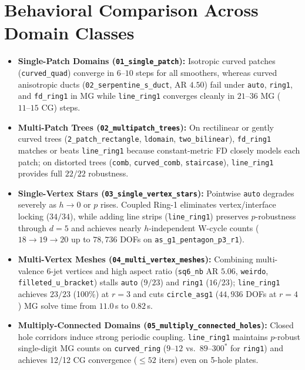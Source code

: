 \documentclass[10pt,a4paper]{article}
\begin{document}
\section{Behavioral Comparison Across Domain Classes}
\begin{itemize}
  \item \textbf{Single-Patch Domains (\texttt{01\_single\_patch}):} Isotropic curved patches (\texttt{curved\_quad}) converge in $6\text{--}10$ steps for all smoothers, whereas curved anisotropic ducts (\texttt{02\_serpentine\_s\_duct}, AR $4.50$) fail under \texttt{auto}, \texttt{ring1}, and \texttt{fd\_ring1} in MG while \texttt{line\_ring1} converges cleanly in $21\text{--}36$ MG ($11\text{--}15$ CG) steps.
  \item \textbf{Multi-Patch Trees (\texttt{02\_multipatch\_trees}):} On rectilinear or gently curved trees (\texttt{2\_patch\_rectangle}, \texttt{ldomain}, \texttt{two\_bilinear}), \texttt{fd\_ring1} matches or beats \texttt{line\_ring1} because constant-metric FD closely models each patch; on distorted trees (\texttt{comb}, \texttt{curved\_comb}, \texttt{staircase}), \texttt{line\_ring1} provides full $22/22$ robustness.
  \item \textbf{Single-Vertex Stars (\texttt{03\_single\_vertex\_stars}):} Pointwise \texttt{auto} degrades severely as $h\to 0$ or $p$ rises. Coupled Ring-1 eliminates vertex/interface locking ($34/34$), while adding line strips (\texttt{line\_ring1}) preserves $p$-robustness through $d=5$ and achieves nearly $h$-independent W-cycle counts ($18\to 19\to 20$ up to $78{,}736$ DOFs on \texttt{as\_g1\_pentagon\_p3\_r1}).
  \item \textbf{Multi-Vertex Meshes (\texttt{04\_multi\_vertex\_meshes}):} Combining multi-valence 6-jet vertices and high aspect ratio (\texttt{sq6\_nb} AR $5.06$, \texttt{weirdo}, \texttt{filleted\_u\_bracket}) stalls \texttt{auto} ($9/23$) and \texttt{ring1} ($16/23$); \texttt{line\_ring1} achieves $23/23$ (100\%) at $r=3$ and cuts \texttt{circle\_asg1} ($44{,}936$ DOFs at $r=4$) MG solve time from $11.0\,$s to $0.82\,$s.
  \item \textbf{Multiply-Connected Domains (\texttt{05\_multiply\_connected\_holes}):} Closed hole corridors induce strong periodic coupling. \texttt{line\_ring1} maintains $p$-robust single-digit MG counts on \texttt{curved\_ring} ($9\text{--}12$ vs.\ $89\text{--}300^*$ for \texttt{ring1}) and achieves 12/12 CG convergence ($\le 52$ iters) even on 5-hole plates.
\end{itemize}
\end{document}
